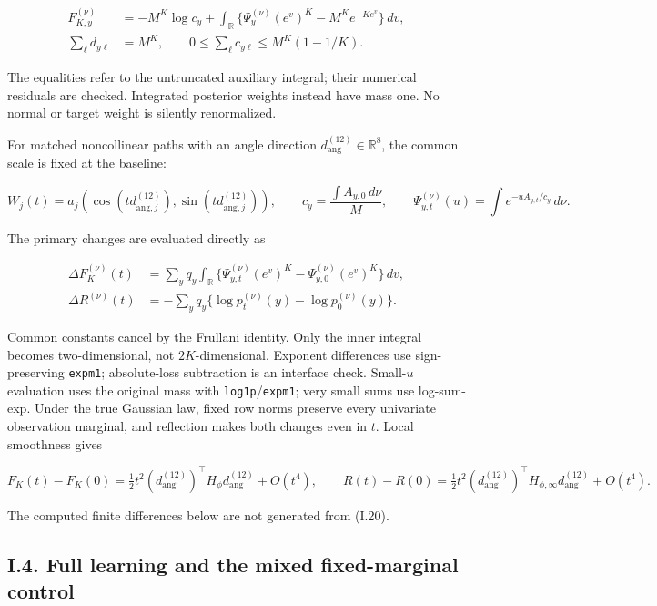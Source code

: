 \documentclass{article}
\begin{document}
\[
\begin{aligned}
F_{K,y}^{(\nu)}&=-M^K\log c_y+
\int_{\mathbb R}\{\Psi_y^{(\nu)}(e^v)^K-M^Ke^{-Ke^v}\}\,dv,\\
\sum_\ell d_{y\ell}&=M^K,\qquad
0\le\sum_\ell c_{y\ell}\le M^K(1-1/K).
\end{aligned}
\tag{I.17}
\]

The equalities refer to the untruncated auxiliary integral; their
numerical residuals are checked. Integrated posterior weights instead
have mass one. No normal or target weight is silently renormalized.

For matched noncollinear paths with an angle direction
\(d_{\mathrm{ang}}^{(12)}\in\mathbb R^8\), the common scale is fixed at
the baseline:

\[
W_j(t)=a_j(\cos(td_{\mathrm{ang},j}^{(12)}),\sin(td_{\mathrm{ang},j}^{(12)})),\qquad
c_y=\frac{\int A_{y,0}\,d\nu}{M},\qquad
\Psi_{y,t}^{(\nu)}(u)=\int e^{-uA_{y,t}/c_y}\,d\nu.
\tag{I.18}
\]

The primary changes are evaluated directly as

\[
\begin{aligned}
\Delta F_K^{(\nu)}(t)&=\sum_yq_y\int_{\mathbb R}
\{\Psi_{y,t}^{(\nu)}(e^v)^K-\Psi_{y,0}^{(\nu)}(e^v)^K\}\,dv,\\
\Delta R^{(\nu)}(t)&=-\sum_yq_y\{\log p_t^{(\nu)}(y)-\log p_0^{(\nu)}(y)\}.
\end{aligned}
\tag{I.19}
\]

Common constants cancel by the Frullani identity. Only the inner
integral becomes two-dimensional, not \(2K\)-dimensional. Exponent
differences use sign-preserving \texttt{expm1}; absolute-loss
subtraction is an interface check. Small-\(u\) evaluation uses the
original mass with \texttt{log1p}/\texttt{expm1}; very small sums use
log-sum-exp. Under the true Gaussian law, fixed row norms preserve every
univariate observation marginal, and reflection makes both changes even
in \(t\). Local smoothness gives

\[
F_K(t)-F_K(0)=\tfrac12t^2(d_{\mathrm{ang}}^{(12)})^\top H_\phi d_{\mathrm{ang}}^{(12)}+O(t^4),\qquad
R(t)-R(0)=\tfrac12t^2(d_{\mathrm{ang}}^{(12)})^\top H_{\phi,\infty}d_{\mathrm{ang}}^{(12)}+O(t^4).
\tag{I.20}
\]

The computed finite differences below are not generated from (I.20).

\subsection*{I.4. Full learning and the mixed fixed-marginal
control}\label{i.4.-full-learning-and-the-mixed-fixed-marginal-control}
\end{document}
